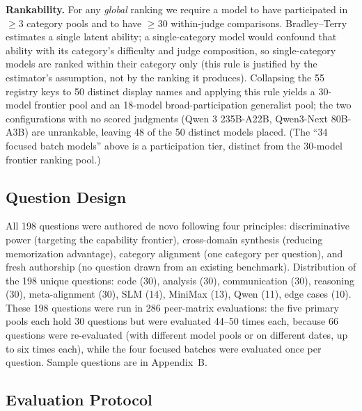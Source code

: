\documentclass{article}
\begin{document}
\textbf{Rankability.} For any \emph{global} ranking we require a model to have participated in $\geq 3$ category pools and to have $\geq 30$ within-judge comparisons. Bradley--Terry estimates a single latent ability; a single-category model would confound that ability with its category's difficulty and judge composition, so single-category models are ranked within their category only (this rule is justified by the estimator's assumption, not by the ranking it produces). Collapsing the 55 registry keys to 50 distinct display names and applying this rule yields a 30-model frontier pool and an 18-model broad-participation generalist pool; the two configurations with no scored judgments (Qwen 3 235B-A22B, Qwen3-Next 80B-A3B) are unrankable, leaving 48 of the 50 distinct models placed. (The ``34 focused batch models'' above is a participation tier, distinct from the 30-model frontier ranking pool.)

\subsection{Question Design}

All 198 questions were authored de novo following four principles: discriminative power (targeting the capability frontier), cross-domain synthesis (reducing memorization advantage), category alignment (one category per question), and fresh authorship (no question drawn from an existing benchmark). Distribution of the 198 unique questions: code (30), analysis (30), communication (30), reasoning (30), meta-alignment (30), SLM (14), MiniMax (13), Qwen (11), edge cases (10). These 198 questions were run in 286 peer-matrix evaluations: the five primary pools each hold 30 questions but were evaluated 44--50 times each, because 66 questions were re-evaluated (with different model pools or on different dates, up to six times each), while the four focused batches were evaluated once per question. Sample questions are in Appendix~B.

\subsection{Evaluation Protocol}
\end{document}
